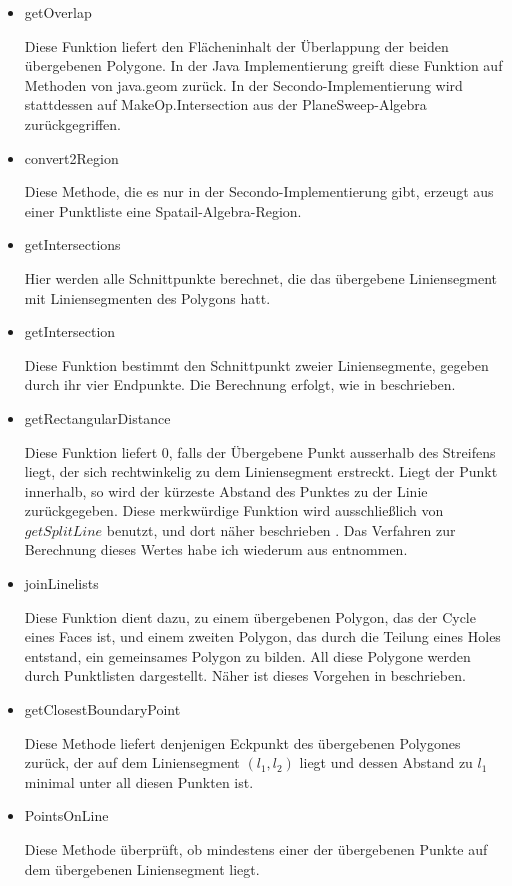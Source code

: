 \begin{itemize}
\item getOverlap

Diese Funktion liefert den Flächeninhalt der Überlappung der beiden übergebenen Polygone. In der Java Implementierung greift diese Funktion auf Methoden von java.geom zurück. In der Secondo-Implementierung wird stattdessen auf MakeOp.Intersection aus der PlaneSweep-Algebra zurückgegriffen.

\item convert2Region

Diese Methode, die es nur in der Secondo-Implementierung gibt, erzeugt aus einer Punktliste eine Spatail-Algebra-Region.

\item getIntersections

Hier werden alle Schnittpunkte berechnet, die das übergebene Liniensegment mit Liniensegmenten des Polygons hatt. 

\item getIntersection

Diese Funktion bestimmt den Schnittpunkt zweier Liniensegmente, gegeben durch ihr vier Endpunkte. Die Berechnung erfolgt, wie in \cite{BW} beschrieben.

\item getRectangularDistance

Diese Funktion liefert 0, falls der Übergebene Punkt ausserhalb des Streifens liegt, der sich rechtwinkelig zu dem Liniensegment erstreckt. Liegt der Punkt innerhalb, so wird der kürzeste Abstand des Punktes zu der Linie zurückgegeben. Diese merkwürdige Funktion wird ausschließlich von $getSplitLine$ benutzt, und dort näher beschrieben . Das Verfahren zur Berechnung dieses Wertes habe ich wiederum aus \cite{BW} entnommen.

\item joinLinelists

Diese Funktion dient dazu, zu einem übergebenen Polygon, das der Cycle eines Faces ist, und einem zweiten Polygon, das durch die Teilung eines Holes entstand, ein gemeinsames Polygon zu bilden. All diese  Polygone werden durch Punktlisten dargestellt. Näher ist dieses Vorgehen in  beschrieben.

\item getClosestBoundaryPoint

Diese Methode liefert denjenigen Eckpunkt des übergebenen Polygones zurück, der auf dem Liniensegment $(l_1,l_2)$ liegt und dessen Abstand zu $l_1$ minimal unter all diesen Punkten ist.

\item PointsOnLine

Diese Methode überprüft, ob mindestens einer der übergebenen Punkte auf dem übergebenen Liniensegment liegt.

\end{itemize}



